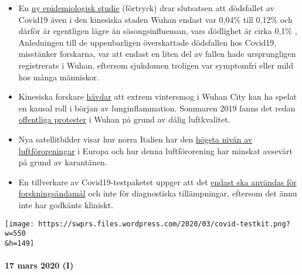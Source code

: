 \begin{itemize}
\tightlist
\item
  En
  \href{https://www.medrxiv.org/content/10.1101/2020.02.12.20022434v2}{ny
  epidemiologisk studie} (förtryck) drar slutsatsen att dödsfallet av
  Covid19 även i den kinesiska staden Wuhan endast var 0,04\% till
  0,12\% och därför är egentligen lägre än säsongsinfluensan, vars
  dödlighet är cirka 0,1\% , Anledningen till de uppenbarligen
  överskattade dödsfallen hos Covid19, misstänker forskarna, var att
  endast en liten del av fallen hade ursprungligen registrerats i Wuhan,
  eftersom sjukdomen troligen var symptomfri eller mild hos många
  människor.
\item
  Kinesiska forskare
  \href{https://www.eurasiareview.com/01022020-polluted-air-could-be-an-important-cause-of-wuhan-pneumonia-oped/}{hävdar}
  att extrem vintersmog i Wuhan City kan ha spelat en kausal roll i
  början av lunginflammation. Sommaren 2019 fanns det redan
  \href{https://www.cnn.com/2019/07/10/asia/china-wuhan-pollution-problems-intl-hnk/index.html}{offentliga
  protester} i Wuhan på grund av dålig luftkvalitet.
\item
  Nya satellitbilder visar hur norra Italien har den
  \href{https://twitter.com/esa/status/1238480433047916545}{högsta nivån
  av luftföroreningar} i Europa och hur denna luftförorening har minskat
  avsevärt på grund av karantänen.
\item
  En tillverkare av Covid19-testpaketet uppger att det
  \href{https://www.creative-diagnostics.com/sars-cov-2-coronavirus-multiplex-rt-qpcr-kit-277854-457.htm}{endast
  ska användas för forskningsändamål} och inte för diagnostiska
  tillämpningar, eftersom det ännu inte har godkänts kliniskt.
\end{itemize}

\texttt{[image: https://swprs.files.wordpress.com/2020/03/covid-testkit.png?w=550\\\&h=149]}

\hypertarget{17-mars-2020-i}{%
\paragraph{17 mars 2020 (I)}\label{17-mars-2020-i}}

